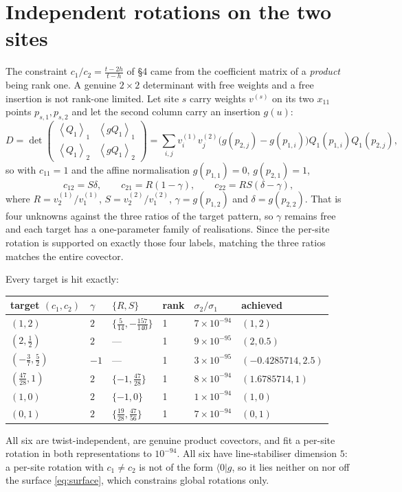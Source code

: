 \documentclass[11pt]{article}
\newcommand{\vac}{\langle 0|}
\newcommand{\Ev}[1]{\left\langle #1 \right\rangle}
\begin{document}
\section{Independent rotations on the two sites}

The constraint $c_1/c_2=\frac{t-2h}{t-h}$ of \S4 came from the coefficient matrix of a \emph{product}
being rank one. A genuine $2\times2$ determinant with free weights and a free insertion is not
rank-one limited. Let site $s$ carry weights $v^{(s)}$ on its two $x_{11}$ points $p_{s,1},p_{s,2}$ and
let the second column carry an insertion $g(u)$:
\begin{equation}
D=\det\begin{pmatrix}\Ev{Q_1}_1&\Ev{gQ_1}_1\\ \Ev{Q_1}_2&\Ev{gQ_1}_2\end{pmatrix}
=\sum_{i,j}v^{(1)}_iv^{(2)}_j\big(g(p_{2,j})-g(p_{1,i})\big)Q_1(p_{1,i})Q_1(p_{2,j}),
\end{equation}
so with $c_{11}=1$ and the affine normalisation $g(p_{1,1})=0$, $g(p_{2,1})=1$,
\begin{equation}
c_{12}=S\delta,\qquad c_{21}=R(1-\gamma),\qquad c_{22}=RS(\delta-\gamma),
\end{equation}
where $R=v^{(1)}_2/v^{(1)}_1$, $S=v^{(2)}_2/v^{(2)}_1$, $\gamma=g(p_{1,2})$ and $\delta=g(p_{2,2})$.
That is four unknowns against the three ratios of the target pattern, so $\gamma$ remains free and each
target has a one-parameter family of realisations. Since the per-site rotation is supported on exactly
those four labels, matching the three ratios matches the entire covector.

Every target is hit exactly:
\begin{center}
\begin{tabular}{llllll}
\toprule
target $(c_1,c_2)$ & $\gamma$ & $\{R,S\}$ & rank & $\sigma_2/\sigma_1$ & achieved\\
\midrule
$(1,2)$ & $2$ & $\{\tfrac{5}{14},-\tfrac{157}{140}\}$ & 1 & $7\times10^{-94}$ & $(1,2)$\\
$(2,\tfrac12)$ & $2$ & --- & 1 & $9\times10^{-95}$ & $(2,0.5)$\\
$(-\tfrac37,\tfrac52)$ & $-1$ & --- & 1 & $3\times10^{-95}$ & $(-0.4285714,2.5)$\\
$(\tfrac{47}{28},1)$ & $2$ & $\{-1,\tfrac{47}{28}\}$ & 1 & $8\times10^{-94}$ & $(1.6785714,1)$\\
$(1,0)$ & $2$ & $\{-1,0\}$ & 1 & $1\times10^{-94}$ & $(1,0)$\\
$(0,1)$ & $2$ & $\{\tfrac{19}{28},\tfrac{47}{56}\}$ & 1 & $7\times10^{-94}$ & $(0,1)$\\
\bottomrule
\end{tabular}
\end{center}
All six are twist-independent, are genuine product covectors, and fit a per-site rotation in both
representations to $10^{-94}$. All six have line-stabiliser dimension $5$: a per-site rotation with
$c_1\neq c_2$ is not of the form $\vac g$, so it lies neither on nor off the surface
\eqref{eq:surface}, which constrains global rotations only.
\end{document}

